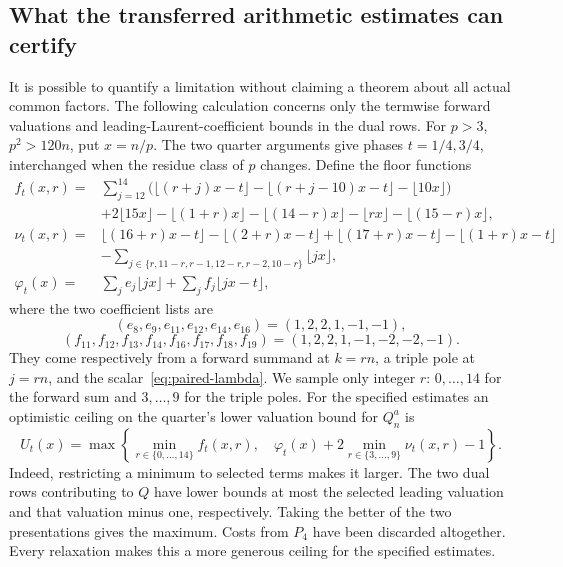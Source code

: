 \subsection{What the transferred arithmetic estimates can certify}
It is possible to quantify a limitation without claiming a theorem
about all actual common factors. The following calculation concerns
only the termwise forward valuations and leading-Laurent-coefficient
bounds in the dual rows.
For $p>3$, $p^2>120n$, put $x=n/p$. The two quarter arguments give
phases $t=1/4,3/4$, interchanged when the residue class of $p$ changes.
Define the floor functions
\begin{align*}
 f_t(x,r)={}&\sum_{j=12}^{14}\bigl(
  \lfloor(r+j)x-t\rfloor-\lfloor(r+j-10)x-t\rfloor-\lfloor10x\rfloor\bigr)\\
 &+2\lfloor15x\rfloor-\lfloor(1+r)x\rfloor-\lfloor(14-r)x\rfloor
                         -\lfloor rx\rfloor-\lfloor(15-r)x\rfloor,\\
 \nu_t(x,r)={}&\lfloor(16+r)x-t\rfloor-\lfloor(2+r)x-t\rfloor
              +\lfloor(17+r)x-t\rfloor-\lfloor(1+r)x-t\rfloor\\
 &-\sum_{j\in\{r,11-r,r-1,12-r,r-2,10-r\}}\lfloor jx\rfloor,\\
 \varphi_t(x)={}&\sum_j e_j\lfloor jx\rfloor+
                            \sum_j f_j\lfloor jx-t\rfloor,
\end{align*}
where the two coefficient lists are
\[
 (e_8,e_9,e_{11},e_{12},e_{14},e_{16})=(1,2,2,1,-1,-1),
\]
\[
 (f_{11},f_{12},f_{13},f_{14},f_{16},f_{17},f_{18},f_{19})
                              =(1,2,2,1,-1,-2,-2,-1).
\]
They come respectively from a forward summand at $k=rn$, a triple
pole at $j=rn$, and the scalar~\eqref{eq:paired-lambda}. We sample only
integer $r$: $0,\ldots,14$ for the forward sum and $3,\ldots,9$ for
the triple poles. For the
specified estimates an optimistic ceiling on the quarter's lower
valuation bound for $Q_n^a$ is
\begin{equation}\label{eq:paired-ceiling}
 U_t(x)=\max\left\{\min_{r\in\{0,\ldots,14\}}f_t(x,r),\quad
          \varphi_t(x)+2\min_{r\in\{3,\ldots,9\}}\nu_t(x,r)-1\right\}.
\end{equation}
Indeed, restricting a minimum to selected terms makes it larger.
The two dual rows contributing to $Q$ have lower bounds at most the
selected leading valuation and that valuation minus one, respectively.
Taking the better of the two presentations gives the maximum. Costs
from $P_4$ have been discarded altogether. Every relaxation makes
this a more generous ceiling for the specified estimates.


